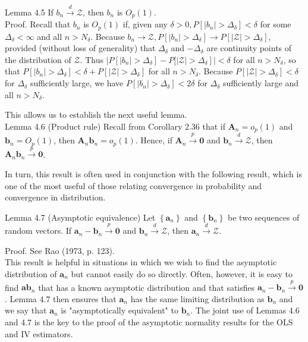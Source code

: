 \documentclass[10pt]{article}
\begin{document}
Lemma 4.5 If $b_{n} \xrightarrow{d} \mathcal{Z}$, then $b_{n}$ is $O_{p}(1)$.\\
Proof. Recall that $b_{n}$ is $O_{p}(1)$ if, given any $\delta>0, P\left[\left|b_{n}\right|>\Delta_{\delta}\right]<\delta$ for some $\Delta_{\delta}<\infty$ and all $n>N_{\delta}$. Because $b_{n} \rightarrow \mathcal{Z}, P\left[\left|b_{n}\right|>\Delta_{\delta}\right] \rightarrow P\left[|\mathcal{Z}|>\Delta_{\delta}\right]$, provided (without loss of generality) that $\Delta_{\delta}$ and $-\Delta_{\delta}$ are continuity points of the distribution of $\mathcal{Z}$. Thus $\mid P\left[\left|b_{n}\right|>\Delta_{\delta}\right]-P[|\mathcal{Z}|> \left.\Delta_{\delta}\right] \mid<\delta$ for all $n>N_{\delta}$, so that $P\left[\left|b_{n}\right|>\Delta_{\delta}\right]<\delta+P\left[|\mathcal{Z}|>\Delta_{\delta}\right]$ for all $n>N_{\delta}$. Because $P\left[|\mathcal{Z}|>\Delta_{\delta}\right]<\delta$ for $\Delta_{\delta}$ sufficiently large, we have $P\left[\left|b_{n}\right|>\Delta_{\delta}\right]<2 \delta$ for $\Delta_{\delta}$ sufficiently large and all $n>N_{\delta}$.

This allows us to establish the next useful lemma.\\
Lemma 4.6 (Product rule) Recall from Corollary 2.36 that if $\mathbf{A}_{n}= o_{p}(1)$ and $\mathbf{b}_{n}=O_{p}(1)$, then $\mathbf{A}_{n} \mathbf{b}_{n}=o_{p}(1)$. Hence, if $\mathbf{A}_{n} \xrightarrow{p} \mathbf{0}$ and $\mathbf{b}_{n} \xrightarrow{d} \mathcal{Z}$, then $\mathbf{A}_{n} \mathbf{b}_{n} \xrightarrow{p} \mathbf{0}$.

In turn, this result is often used in conjunction with the following result, which is one of the most useful of those relating convergence in probability and convergence in distribution.

Lemma 4.7 (Asymptotic equivalence) Let $\left\{\mathbf{a}_{n}\right\}$ and $\left\{\mathbf{b}_{n}\right\}$ be two sequences of random vectors. If $\mathbf{a}_{n}-\mathbf{b}_{n} \xrightarrow{p} \mathbf{0}$ and $\mathbf{b}_{n} \xrightarrow{d} \mathcal{Z}$, then $\mathbf{a}_{n} \xrightarrow{d} \mathcal{Z}$.

Proof. See Rao (1973, p. 123).\\
This result is helpful in situations in which we wish to find the asymptotic distribution of $\mathbf{a}_{n}$ but cannot easily do so directly. Often, however, it is easy to find $\mathbf{a} \mathbf{b}_{n}$ that has a known asymptotic distribution and that satisfies $\mathbf{a}_{n}-\mathbf{b}_{n} \xrightarrow{p} \mathbf{0}$. Lemma 4.7 then ensures that $\mathbf{a}_{n}$ has the same limiting distribution as $\mathbf{b}_{n}$ and we say that $\mathbf{a}_{n}$ is "asymptotically equivalent" to $\mathbf{b}_{n}$. The joint use of Lemmas 4.6 and 4.7 is the key to the proof of the asymptotic normality results for the OLS and IV estimators.
\end{document}
